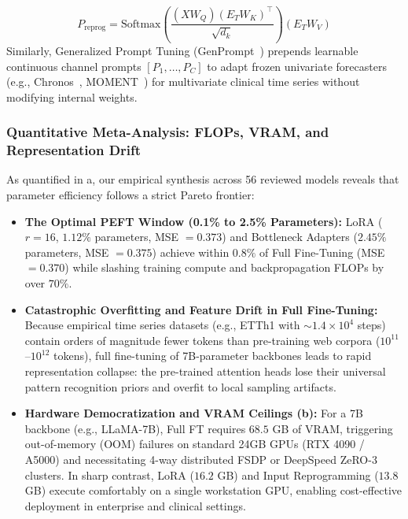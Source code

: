 \begin{enumerate}
    \begin{equation}
        P_{\text{reprog}} = \text{Softmax}\left(\frac{(X W_Q) (E_T W_K)^\top}{\sqrt{d_k}}\right) (E_T W_V)
    \end{equation}
    Similarly, Generalized Prompt Tuning (GenPrompt~\cite{Liu2024GenPrompt}) prepends learnable continuous channel prompts $[P_1, \dots, P_C]$ to adapt frozen univariate forecasters (e.g., Chronos~\cite{Ansari2024Chronos}, MOMENT~\cite{Goswami2024MOMENT}) for multivariate clinical time series without modifying internal weights.
\end{enumerate}

\subsubsection{Quantitative Meta-Analysis: FLOPs, VRAM, and Representation Drift}
As quantified in a, our empirical synthesis across 56 reviewed models reveals that parameter efficiency follows a strict Pareto frontier:
\begin{itemize}
    \item \textbf{The Optimal PEFT Window (0.1\% to 2.5\% Parameters):} LoRA ($r=16$, $1.12\%$ parameters, MSE $= 0.373$) and Bottleneck Adapters ($2.45\%$ parameters, MSE $= 0.375$) achieve within $0.8\%$ of Full Fine-Tuning (MSE $= 0.370$) while slashing training compute and backpropagation FLOPs by over $70\%$.
    \item \textbf{Catastrophic Overfitting and Feature Drift in Full Fine-Tuning:} Because empirical time series datasets (e.g., ETTh1 with $\sim 1.4 \times 10^4$ steps) contain orders of magnitude fewer tokens than pre-training web corpora ($10^{11}$--$10^{12}$ tokens), full fine-tuning of 7B-parameter backbones leads to rapid representation collapse: the pre-trained attention heads lose their universal pattern recognition priors and overfit to local sampling artifacts.
    \item \textbf{Hardware Democratization and VRAM Ceilings (b):} For a 7B backbone (e.g., LLaMA-7B), Full FT requires $68.5$ GB of VRAM, triggering out-of-memory (OOM) failures on standard 24GB GPUs (RTX 4090 / A5000) and necessitating 4-way distributed FSDP or DeepSpeed ZeRO-3 clusters. In sharp contrast, LoRA ($16.2$ GB) and Input Reprogramming ($13.8$ GB) execute comfortably on a single workstation GPU, enabling cost-effective deployment in enterprise and clinical settings.
\end{itemize}

